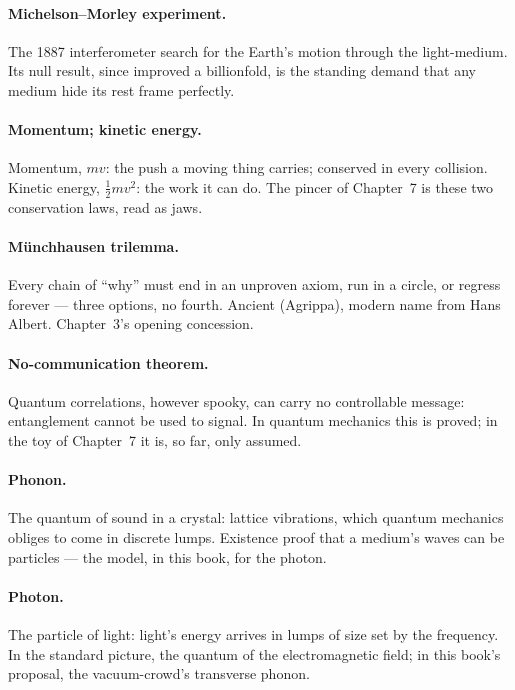 \documentclass[fontsize=11pt,paper=a4,pagesize=auto,parskip=half-]{scrbook}
\begin{document}
\paragraph{Michelson--Morley experiment.} The 1887 interferometer search for the Earth's motion through the light-medium. Its null result, since improved a billionfold, is the standing demand that any medium hide its rest frame perfectly.

\paragraph{Momentum; kinetic energy.} Momentum, $mv$: the push a moving thing carries; conserved in every collision. Kinetic energy, $\tfrac{1}{2}mv^{2}$: the work it can do. The pincer of Chapter~7 is these two conservation laws, read as jaws.

\paragraph{M\"unchhausen trilemma.} Every chain of ``why'' must end in an unproven axiom, run in a circle, or regress forever --- three options, no fourth. Ancient (Agrippa), modern name from Hans Albert. Chapter~3's opening concession.

\paragraph{No-communication theorem.} Quantum correlations, however spooky, can carry no controllable message: entanglement cannot be used to signal. In quantum mechanics this is proved; in the toy of Chapter~7 it is, so far, only assumed.

\paragraph{Phonon.} The quantum of sound in a crystal: lattice vibrations, which quantum mechanics obliges to come in discrete lumps. Existence proof that a medium's waves can be particles --- the model, in this book, for the photon.

\paragraph{Photon.} The particle of light: light's energy arrives in lumps of size set by the frequency. In the standard picture, the quantum of the electromagnetic field; in this book's proposal, the vacuum-crowd's transverse phonon.
\end{document}
